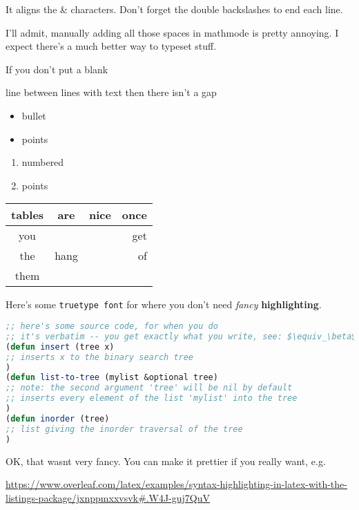 \documentclass[11pt]{article}
\begin{document}
It aligns the \& characters. Don't forget the double backslashes to end each line.

I'll admit, manually adding all those spaces in mathmode is pretty annoying. I expect there's a much better way to typeset stuff.


If you don't
put a blank

line between
lines
with text
then
there
isn't
a
gap


\begin{itemize}
  \item bullet
  \item points
\end{itemize}

\begin{enumerate}
  \item numbered
  \item points
\end{enumerate}

\begin{tabular}{c|c|l|||r|}
  tables & are & nice & once \\ \hline
  you & & & get \\
  the & hang & & of \\ \hline \hline
  them & & & \\ \hline
\end{tabular}

Here's some \texttt{truetype font} for where you don't need \emph{fancy} \textbf{highlighting}.

\begin{lstlisting}[language=Lisp]
;; here's some source code, for when you do
;; it's verbatim -- you get exactly what you write, see: $\equiv_\beta$
(defun insert (tree x)
;; inserts x to the binary search tree
)
(defun list-to-tree (mylist &optional tree)
;; note: the second argument 'tree' will be nil by default
;; inserts every element of the list 'mylist' into the tree
)
(defun inorder (tree)
;; list giving the inorder traversal of the tree
)
\end{lstlisting}

OK, that wasnt very fancy. You can make it prettier if you really want, e.g.

\url{https://www.overleaf.com/latex/examples/syntax-highlighting-in-latex-with-the-listings-package/jxnppmxxvsvk#.W4J-guj7QuV}
\end{document}
